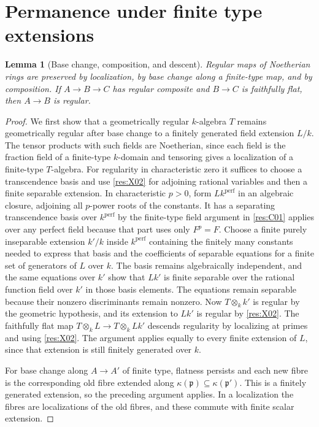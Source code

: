 \documentclass[11pt,oneside,openany]{book}
\newtheorem{lemma}[theorem]{Lemma}
\theoremstyle{definition}
\theoremstyle{remark}
\begin{document}
\section[Finite-type permanence]{Permanence under finite type extensions}

\begin{lemma}[Base change, composition, and descent]\label{res:X11}
Regular maps of Noetherian rings are preserved by localization, by base change along a finite-type map, and by composition. If \(A\to B\to C\) has regular composite and \(B\to C\) is faithfully flat, then \(A\to B\) is regular.
\end{lemma}
\begin{proof}
We first show that a geometrically regular \(k\)-algebra \(T\) remains geometrically regular after base change to a finitely generated field extension \(L/k\). The tensor products with such fields are Noetherian, since each field is the fraction field of a finite-type \(k\)-domain and tensoring gives a localization of a finite-type \(T\)-algebra. For regularity in characteristic zero it suffices to choose a transcendence basis and use \ref{res:X02} for adjoining rational variables and then a finite separable extension. In characteristic \(p>0\), form \(Lk^{\mathrm{perf}}\) in an algebraic closure, adjoining all \(p\)-power roots of the constants. It has a separating transcendence basis over \(k^{\mathrm{perf}}\) by the finite-type field argument in \ref{res:C01} applies over any perfect field because that part uses only \(F^p=F\). Choose a finite purely inseparable extension \(k'/k\) inside \(k^{\mathrm{perf}}\) containing the finitely many constants needed to express that basis and the coefficients of separable equations for a finite set of generators of \(L\) over \(k\). The basis remains algebraically independent, and the same equations over \(k'\) show that \(Lk'\) is finite separable over the rational function field over \(k'\) in those basis elements. The equations remain separable because their nonzero discriminants remain nonzero. Now \(T\otimes_k k'\) is regular by the geometric hypothesis, and its extension to \(Lk'\) is regular by \ref{res:X02}. The faithfully flat map \(T\otimes_k L\to T\otimes_k Lk'\) descends regularity by localizing at primes and using \ref{res:X02}. The argument applies equally to every finite extension of \(L\), since that extension is still finitely generated over \(k\).

For base change along \(A\to A'\) of finite type, flatness persists and each new fibre is the corresponding old fibre extended along \(\kappa(\mathfrak p)\subseteq\kappa(\mathfrak p')\). This is a finitely generated extension, so the preceding argument applies. In a localization the fibres are localizations of the old fibres, and these commute with finite scalar extension.


\end{proof}
\end{document}
